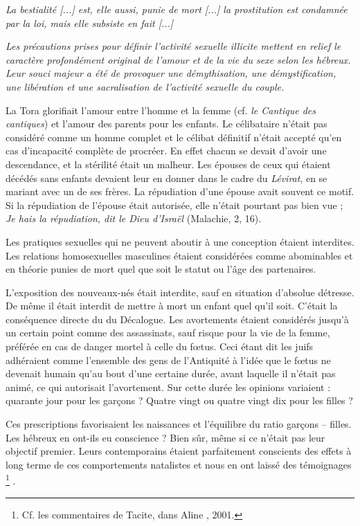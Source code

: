 \begin{displayquote}
{ \emph{La bestialité \emph{[...]} est, elle aussi, punie de mort \emph{[...]} la prostitution est condamnée par la loi, mais elle subsiste en fait \emph{[...]}}

 \emph{Les précautions prises pour définir l'activité sexuelle illicite mettent en relief le caractère profondément original de l'amour et de la vie du sexe selon les hébreux. Leur souci majeur a été de provoquer une démythisation, une démystification, une libération et une sacralisation de l'activité sexuelle du couple.}
}%
\end{displayquote}

 La Tora glorifiait l'amour entre l'homme et la femme (cf. \emph{le Cantique des cantiques}) et l'amour des parents pour les enfants. Le célibataire n'était pas considéré comme un homme complet et le célibat définitif n'était accepté qu'en cas d'incapacité complète de procréer. En effet chacun se devait d'avoir une descendance, et la stérilité était un malheur. Les épouses de ceux qui étaient décédés sans enfants devaient leur en donner dans le cadre du \emph{Lévirat}, en se mariant avec un de ses frères. La répudiation d'une épouse avait souvent ce motif. Si la répudiation de l'épouse était autorisée, elle n'était pourtant pas bien vue ; \emph{Je hais la répudiation, dit le Dieu d'Israël} (Malachie, 2, 16).

 Les pratiques sexuelles qui ne peuvent aboutir à une conception étaient interdites. Les relations homosexuelles masculines étaient considérées comme abominables et en théorie punies de mort quel que soit le statut ou l'âge des partenaires. 

 L'exposition des nouveaux-nés était interdite, sauf en situation d'absolue détresse. De même il était interdit de mettre à mort un enfant quel qu'il soit. C'était la conséquence directe du  du Décalogue. Les avortements étaient considérés jusqu'à un certain point comme des assassinats, sauf risque pour la vie de la femme, préférée en cas de danger mortel à celle du fœtus. Ceci étant dit les juifs adhéraient comme l'ensemble des gens de l'Antiquité à l'idée que le fœtus ne devenait humain qu'au bout d'une certaine durée, avant laquelle il n'était pas animé, ce qui autorisait l'avortement. Sur cette durée les opinions variaient : quarante jour pour les garçons ? Quatre vingt ou quatre vingt dix pour les filles ? 

 Ces prescriptions favorisaient les naissances et l'équilibre du ratio garçons -- filles. Les hébreux en ont-ils eu conscience ? Bien sûr, même si ce n'était pas leur objectif premier. Leurs contemporains étaient parfaitement conscients des effets à long terme de ces comportements natalistes et nous en ont laissé des témoignages%
\footnote{Cf. les commentaires de Tacite, dans Aline , 2001.}%
.

